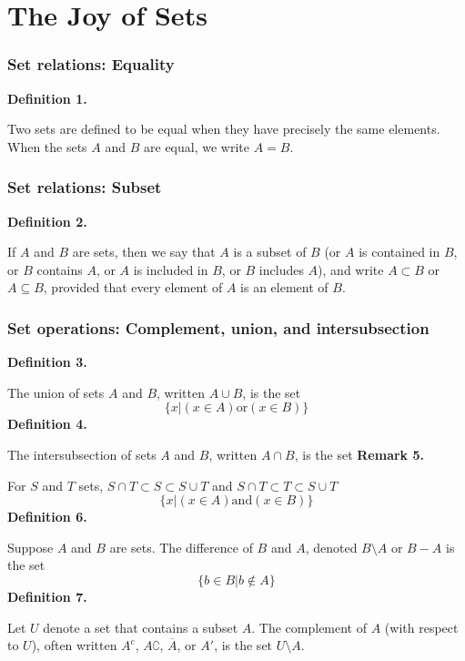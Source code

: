 \pagebreak

\section*{The Joy of Sets}
\subsubsection*{Set relations: Equality}
\textbf{Definition 1.}\\
\par\noindent Two sets are defined to be equal when they have precisely the same elements. When the sets $A$ and $B$ are equal, we write $A=B$.
\subsubsection*{Set relations: Subset}
\textbf{Definition 2.}\\
\par\noindent If $A$ and $B$ are sets, then we say that $A$ is a subset of $B$ (or $A$ is contained in $B$, or $B$ contains $A$, or $A$ is included in $B$, or $B$ includes $A$), and write $A\subset{}B$ or $A\subseteq{}B$, provided that every element of $A$ is an element of $B$.
\subsubsection*{Set operations: Complement, union, and intersubsection}
\textbf{Definition 3.}\\
\par\noindent The union of sets $A$ and $B$, written $A\cup{}B$, is the set \[\{x|(x\in{}A)\mathrm{or}(x\in{}B)\}\]
\textbf{Definition 4.}\\
\par\noindent The intersubsection of sets $A$ and $B$, written $A\cap{}B$, is the set
\textbf{Remark 5.}\\
\par\noindent For $S$ and $T$ sets, $S\cap{}T\subset{}S\subset{}S\cup{}T$ and $S\cap{}T\subset{}T\subset{}S\cup{}T$
\[\{x|(x\in{}A)\mathrm{and}(x\in{}B)\}\]
\textbf{Definition 6.}\\
\par\noindent Suppose $A$ and $B$ are sets. The difference of $B$ and $A$, denoted $B\setminus{}A$ or $B-A$ is the set
\[\{b\in{}B|b\notin{}A\}\]
\textbf{Definition 7.}\\
\par\noindent Let $U$ denote a set that contains a subset $A$. The complement of $A$ (with respect to $U$), often written $A^{c}$, $A\complement$, $\overline{A}$, or $A'$, is the set $U\setminus{}A$.
